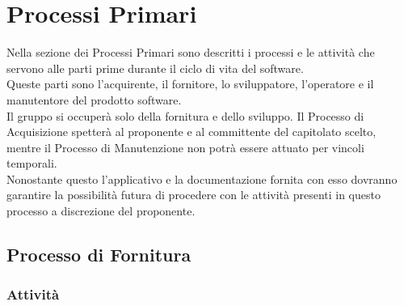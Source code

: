 %
%



\section{Processi Primari}
Nella sezione dei Processi Primari sono descritti i processi e le attività che servono alle parti prime durante il ciclo di vita del software. \\
Queste parti sono l'acquirente, il fornitore, lo sviluppatore, l'operatore e il manutentore del prodotto software. \\
Il gruppo \groupName{} si occuperà solo della fornitura e dello sviluppo. Il Processo di Acquisizione spetterà al proponente e al committente del capitolato scelto, mentre il Processo di Manutenzione non potrà essere attuato per vincoli temporali. \\
Nonostante questo l'applicativo \projectName{} e la documentazione fornita con esso dovranno garantire la possibilità futura di procedere con le attività presenti in questo processo a discrezione del proponente.

	\subsection{Processo di Fornitura}
		\subsubsection{Attività}
		
